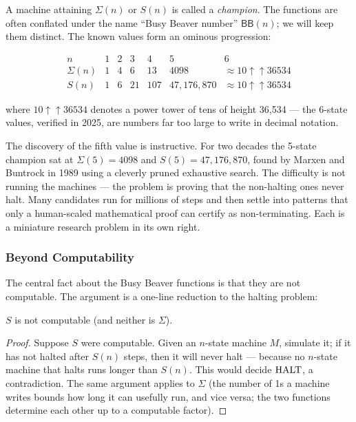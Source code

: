 A machine attaining $\Sigma(n)$ or $S(n)$ is called a \emph{champion}. The functions are often conflated under the name ``Busy Beaver number'' $\mathsf{BB}(n)$; we will keep them distinct. The known values form an ominous progression:

\[
\begin{array}{c|cccccc}
n & 1 & 2 & 3 & 4 & 5 & 6 \\
\hline
\Sigma(n) & 1 & 4 & 6 & 13 & 4098 & \approx 10{\uparrow\uparrow} 36534 \\
S(n) & 1 & 6 & 21 & 107 & 47{,}176{,}870 & \approx 10{\uparrow\uparrow} 36534
\end{array}
\]

where $10{\uparrow\uparrow}36534$ denotes a power tower of tens of height 36,534 --- the 6-state values, verified in 2025, are numbers far too large to write in decimal notation.

The discovery of the fifth value is instructive. For two decades the 5-state champion sat at $\Sigma(5) = 4098$ and $S(5) = 47,\!176,\!870$, found by Marxen and Buntrock in 1989 using a cleverly pruned exhaustive search. The difficulty is not running the machines --- the problem is proving that the non-halting ones never halt. Many candidates run for millions of steps and then settle into patterns that only a human-scaled mathematical proof can certify as non-terminating. Each is a miniature research problem in its own right.

\subsubsection*{Beyond Computability}

The central fact about the Busy Beaver functions is that they are not computable. The argument is a one-line reduction to the halting problem:

\begin{theorem}
$S$ is not computable (and neither is $\Sigma$).
\end{theorem}

\begin{proof}
Suppose $S$ were computable. Given an $n$-state machine $M$, simulate it; if it has not halted after $S(n)$ steps, then it will never halt --- because no $n$-state machine that halts runs longer than $S(n)$. This would decide $\text{HALT}$, a contradiction. The same argument applies to $\Sigma$ (the number of 1s a machine writes bounds how long it can usefully run, and vice versa; the two functions determine each other up to a computable factor).
\end{proof}

